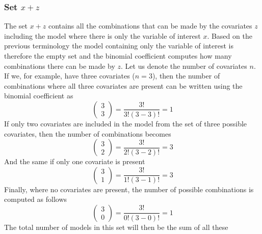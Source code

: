 \subsubsection{Set $x + z$}
The set $x + z$ contains all the combinations that can be made by the covariates $z$ including the model where there is only the variable of interest $x$. Based on the previous terminology the model containing only the variable of interest is therefore the empty set and the binomial coefficient computes how many combinations there can be made by $z$. Let us denote the number of covariates $n$. If we, for example, have three covariates ($n=3$), then the number of combinations where all three covariates are present can be written using the binomial coefficient as
\[\left( \begin{array}{c}
3 \\ 
3 \end{array}
\right)=\frac{3!}{3!\left(3-3\right)!}=1\]
If only two covariates are included in the model from the set of three possible covariates, then the number of combinations becomes 
\[\left( \begin{array}{c}
3 \\ 
2 \end{array}
\right)=\frac{3!}{2!\left(3-2\right)!}=3\] 
And the same if only one covariate is present
\[\left( \begin{array}{c}
3 \\ 
1 \end{array}
\right)=\frac{3!}{1!\left(3-1\right)!}=3\] 
Finally, where no covariates are present, the number of possible combinations is computed as follows
\[\left( \begin{array}{c}
3 \\ 
0 \end{array}
\right)=\frac{3!}{0!\left(3-0\right)!}=1\] 
The total number of models in this set will then be the sum of all these


